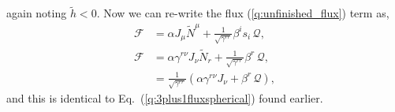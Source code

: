 again noting $\tilde h<0$. Now we can re-write the flux (\ref{q:unfinished_flux}) term as, 
\begin{align}
\mathcal{F} &= \alpha J_\mu \tilde N^\mu +  \frac{1}{\sqrt{\gamma^{rr}}}\beta^i s_i\, \mathcal{Q} , \\
\mathcal{F} &= \alpha\gamma^{ r\nu} J_\nu \tilde N_r +  \frac{1}{\sqrt{\gamma^{rr}}}\beta^r \, \mathcal{Q} , \\
            &= \frac{1}{\sqrt{\gamma^{rr}}}( \alpha \gamma^{ r\nu} J_\nu +  \beta^r \, \mathcal{Q} ), 
\end{align} 
and this is identical to Eq.~(\ref{q:3plus1fluxspherical}) found earlier.







